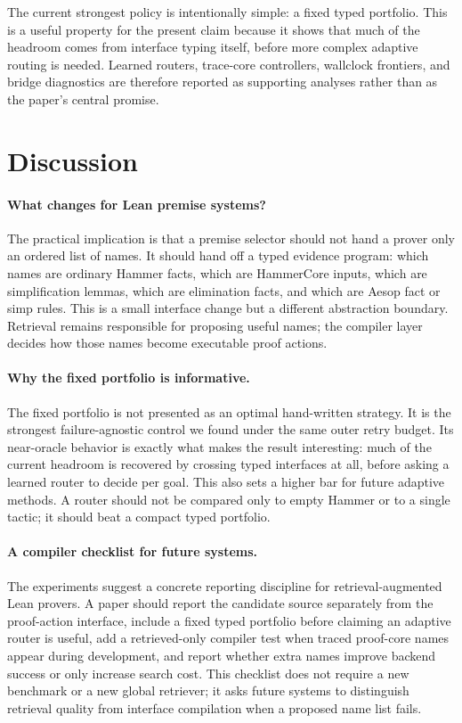 \documentclass{article}
\begin{document}
The current strongest policy is intentionally simple: a fixed typed portfolio. This is a useful property for the present claim because it shows that much of the headroom comes from interface typing itself, before more complex adaptive routing is needed. Learned routers, trace-core controllers, wallclock frontiers, and bridge diagnostics are therefore reported as supporting analyses rather than as the paper's central promise.

\section{Discussion}

\paragraph{What changes for Lean premise systems?}
The practical implication is that a premise selector should not hand a prover only an ordered list of names. It should hand off a typed evidence program: which names are ordinary Hammer facts, which are HammerCore inputs, which are simplification lemmas, which are elimination facts, and which are Aesop fact or simp rules. This is a small interface change but a different abstraction boundary. Retrieval remains responsible for proposing useful names; the compiler layer decides how those names become executable proof actions.

\paragraph{Why the fixed portfolio is informative.}
The fixed portfolio is not presented as an optimal hand-written strategy. It is the strongest failure-agnostic control we found under the same outer retry budget. Its near-oracle behavior is exactly what makes the result interesting: much of the current headroom is recovered by crossing typed interfaces at all, before asking a learned router to decide per goal. This also sets a higher bar for future adaptive methods. A router should not be compared only to empty Hammer or to a single tactic; it should beat a compact typed portfolio.

\paragraph{A compiler checklist for future systems.}
The experiments suggest a concrete reporting discipline for retrieval-augmented Lean provers. A paper should report the candidate source separately from the proof-action interface, include a fixed typed portfolio before claiming an adaptive router is useful, add a retrieved-only compiler test when traced proof-core names appear during development, and report whether extra names improve backend success or only increase search cost. This checklist does not require a new benchmark or a new global retriever; it asks future systems to distinguish retrieval quality from interface compilation when a proposed name list fails.
\end{document}
